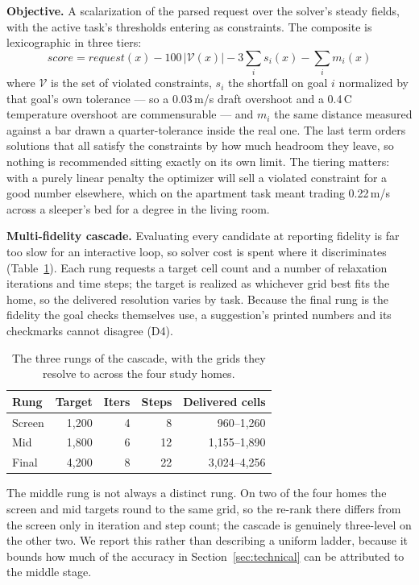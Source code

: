 \documentclass[manuscript,review,anonymous]{acmart}
\begin{document}
\textbf{Objective.} A scalarization of the parsed request over the solver's
steady fields, with the active task's thresholds entering as constraints. The
composite is lexicographic in three tiers:
\[
  \textit{score} = \textit{request}(x) - 100\,|\mathcal{V}(x)| - 3\sum_i s_i(x) -
  \sum_i m_i(x)
\]
where $\mathcal{V}$ is the set of violated constraints, $s_i$ the shortfall on
goal $i$ normalized by that goal's own tolerance --- so a 0.03\,m/s draft
overshoot and a 0.4\,\textdegree C temperature overshoot are commensurable ---
and $m_i$ the same distance measured against a bar drawn a quarter-tolerance
inside the real one. The last term orders solutions that all satisfy the
constraints by how much headroom they leave, so nothing is recommended sitting
exactly on its own limit. The tiering matters: with a purely linear penalty the
optimizer will sell a violated constraint for a good number elsewhere, which on
the apartment task meant trading 0.22\,m/s across a sleeper's bed for a degree in
the living room.

\textbf{Multi-fidelity cascade.} Evaluating every candidate at reporting fidelity
is far too slow for an interactive loop, so solver cost is spent where it
discriminates (Table~\ref{tab:cascade}). Each rung requests a target cell count
and a number of relaxation iterations and time steps; the target is realized as
whichever grid best fits the home, so the delivered resolution varies by task.
Because the final rung is the fidelity the goal checks themselves use, a
suggestion's printed numbers and its checkmarks cannot disagree (D4).

\begin{table}[t]
  \caption{The three rungs of the cascade, with the grids they resolve to across
    the four study homes.}
  \label{tab:cascade}
  \small
  \begin{tabular}{lrrrr}
    \toprule
    Rung & Target & Iters & Steps & Delivered cells \\
    \midrule
    Screen & 1{,}200 & 4 & 8  & 960--1{,}260 \\
    Mid    & 1{,}800 & 6 & 12 & 1{,}155--1{,}890 \\
    Final  & 4{,}200 & 8 & 22 & 3{,}024--4{,}256 \\
    \bottomrule
  \end{tabular}
\end{table}

The middle rung is not always a distinct rung. On two of the four homes the
screen and mid targets round to the same grid, so the re-rank there differs from
the screen only in iteration and step count; the cascade is genuinely three-level
on the other two. We report this rather than describing a uniform ladder,
because it bounds how much of the accuracy in Section~\ref{sec:technical} can be
attributed to the middle stage.
\end{document}

